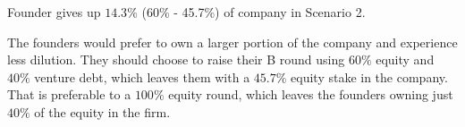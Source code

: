 \documentclass[11pt]{article}
\begin{document}
Founder gives up $14.3 \%$ (60\% - 45.7\%) of company in Scenario 2.

The founders would prefer to own a larger portion of the company and experience less dilution. They should choose to raise their B round using $60 \%$ equity and $40 \%$ venture debt, which leaves them with a $45.7 \%$ equity stake in the company. That is preferable to a $100 \%$ equity round, which leaves the founders owning just $40 \%$ of the equity in the firm.
\end{document}
